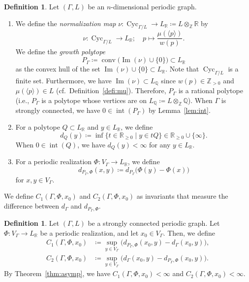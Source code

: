 \documentclass[10pt,a4paper]{amsart}
\theoremstyle{plain}
\theoremstyle{definition}
\newtheorem{defi}[cdrthm]{Definition}
\theoremstyle{remark}
\begin{document}
\setcounter{cdrthm}{18}
\begin{defi}\label{defi:P}
Let $(\Gamma , L)$ be an $n$-dimensional periodic graph. 
\begin{enumerate}
\item 
We define the \textit{normalization map} 
$\nu : \operatorname{Cyc}_{\Gamma /L} \to L_{\mathbb{R}} \coloneqq  L \otimes _{\mathbb{Z}} \mathbb{R}$ by 
\[
\nu: \operatorname{Cyc}_{\Gamma /L} \to L_{\mathbb{R}}; \quad p \mapsto \frac{\mu(\langle p \rangle )}{w(p)}. 
\]
We define the \textit{growth polytope}
\[
P_{\Gamma} \coloneqq  \operatorname{conv} \bigl( \operatorname{Im}(\nu) \cup \{ 0 \} \bigr) \subset L_{\mathbb{R}}
\]
as the convex hull of the set 
$\operatorname{Im}(\nu) \cup \{ 0 \} \subset L_{\mathbb{R}}$. 
Note that $\operatorname{Cyc}_{\Gamma /L}$ is a finite set. 
Furthermore, we have $\operatorname{Im}(\nu) \subset L_{\mathbb{Q}}$ since $w(p) \in \mathbb{Z}_{>0}$ and $\mu(\langle p \rangle ) \in L$ (cf.\ Definition~\ref{defi:mu}). 
Therefore, $P_{\Gamma}$ is a rational polytope 
(i.e., $P_{\Gamma}$ is a polytope whose vertices are on $L_{\mathbb{Q}} \coloneqq  L \otimes _{\mathbb{Z}} \mathbb{Q}$). 
When $\Gamma$ is strongly connected, we have $0 \in \operatorname{int}(P_{\Gamma})$ by Lemma~\ref{lem:int}. 
 
\item 
For a polytope $Q \subset L_{\mathbb{R}}$ and $y \in L_{\mathbb{R}}$, we define 
\[
d_{Q}(y) \coloneqq  \inf \{ t \in \mathbb{R}_{\ge 0} \mid y \in t Q \} \in \mathbb{R}_{\ge 0} \cup \{ \infty \}. 
\]
When $0 \in \operatorname{int}(Q)$, 
we have $d_{Q}(y) < \infty$ for any $y \in L_{\mathbb{R}}$. 

\item
For a periodic realization $\Phi\colon V_{\Gamma} \to L_{\mathbb{R}}$, we define 
\[
d_{P_{\Gamma}, \Phi}(x, y) \coloneqq  d_{P_{\Gamma}}\bigl( \Phi(y) - \Phi(x) \bigr)
\]
for $x, y \in V_{\Gamma}$. 
\end{enumerate}
\end{defi}

\setcounter{cdrthm}{23}
We define $C_{1}(\Gamma, \Phi, x_0)$ and $C_{2}(\Gamma, \Phi, x_0)$ as invariants that measure the difference between $d_{\Gamma}$ and $d_{P_{\Gamma}, \Phi}$. 

\begin{defi}
Let $(\Gamma , L)$ be a strongly connected periodic graph. 
Let $\Phi : V_{\Gamma} \to L_{\mathbb{R}}$ be a periodic realization, and let $x_0 \in V_{\Gamma}$. 
Then, we define 
\begin{align*}
C_{1}(\Gamma, \Phi, x_0) &\coloneqq  \sup _{y \in V_{\Gamma}} \bigl( d_{P_{\Gamma}, \Phi} (x_0, y) - d_{\Gamma} (x_0, y) \bigr), \\
C_{2}(\Gamma, \Phi, x_0) &\coloneqq  \sup _{y \in V_{\Gamma}} \bigl( d_{\Gamma}(x_0, y) - d_{P_{\Gamma}, \Phi} ( x_0, y ) \bigr). 
\end{align*}
By Theorem~\ref{thm:asymp}, we have $C_{1}(\Gamma, \Phi, x_0) < \infty$ and $C_{2}(\Gamma, \Phi, x_0) < \infty$. 
\end{defi}
\end{document}
